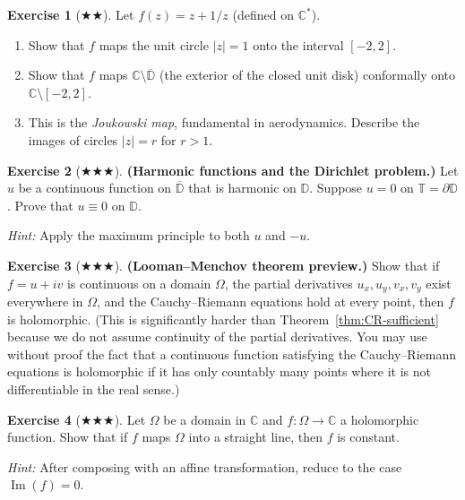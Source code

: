 \documentclass[12pt,a4paper,openany]{book}
\theoremstyle{definition}
\newtheorem{exercise}{Exercise}[chapter]
\theoremstyle{plain}
\theoremstyle{remark}
\newcommand{\C}{\mathbb{C}}
\newcommand{\D}{\mathbb{D}}
\newcommand{\T}{\mathbb{T}}
\DeclareMathOperator{\im}{Im}
\newcommand{\abs}[1]{\left|#1\right|}
\newcommand{\conj}[1]{\overline{#1}}
\begin{document}
\begin{exercise}[$\bigstar\!\bigstar$]
\label{exo:ch2-10}
Let $f(z) = z + 1/z$ (defined on $\C^*$).
\begin{enumerate}[label=\textup{(\alph*)}]
  \item Show that $f$ maps the unit circle $\abs{z}=1$ onto the interval $[-2,2]$.
  \item Show that $f$ maps $\C\setminus\conj{\D}$ (the exterior of the closed unit disk) conformally onto $\C\setminus[-2,2]$.
  \item This is the \emph{Joukowski map}, fundamental in aerodynamics. Describe the images of circles $\abs{z}=r$ for $r>1$.
\end{enumerate}
\end{exercise}

\begin{exercise}[$\bigstar\!\bigstar\!\bigstar$]
\label{exo:ch2-11}
\textbf{(Harmonic functions and the Dirichlet problem.)} Let $u$ be a continuous function on $\conj{\D}$ that is harmonic on $\D$. Suppose $u=0$ on $\T = \partial\D$. Prove that $u\equiv 0$ on $\D$.

\textit{Hint:} Apply the maximum principle to both $u$ and $-u$.
\end{exercise}

\begin{exercise}[$\bigstar\!\bigstar\!\bigstar$]
\label{exo:ch2-12}
\textbf{(Looman--Menchov theorem preview.)} Show that if $f=u+iv$ is continuous on a domain $\Omega$, the partial derivatives $u_x,u_y,v_x,v_y$ exist everywhere in $\Omega$, and the Cauchy--Riemann equations hold at every point, then $f$ is holomorphic. (This is significantly harder than Theorem~\ref{thm:CR-sufficient} because we do not assume continuity of the partial derivatives. You may use without proof the fact that a continuous function satisfying the Cauchy--Riemann equations is holomorphic if it has only countably many points where it is not differentiable in the real sense.)
\end{exercise}

\begin{exercise}[$\bigstar\!\bigstar\!\bigstar$]
\label{exo:ch2-13}
Let $\Omega$ be a domain in $\C$ and $f:\Omega\to\C$ a holomorphic function. Show that if $f$ maps $\Omega$ into a straight line, then $f$ is constant.

\textit{Hint:} After composing with an affine transformation, reduce to the case $\im(f) = 0$.
\end{exercise}
\end{document}

